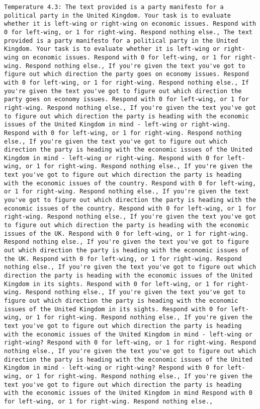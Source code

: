 \begin{lstlisting}[label=lst:poor_performing_prompts]
	Temperature 4.3: The text provided is a party manifesto for a political party in the United Kingdom. Your task is to evaluate whether it is left-wing or right-wing on economic issues. Respond with 0 for left-wing, or 1 for right-wing. Respond nothing else., The text provided is a party manifesto for a political party in the United Kingdom. Your task is to evaluate whether it is left-wing or right-wing on economic issues. Respond with 0 for left-wing, or 1 for right-wing. Respond nothing else., If you're given the text you've got to figure out which direction the party goes on economy issues. Respond with 0 for left-wing, or 1 for right-wing. Respond nothing else., If you're given the text you've got to figure out which direction the party goes on economy issues. Respond with 0 for left-wing, or 1 for right-wing. Respond nothing else., If you're given the text you've got to figure out which direction the party is heading with the economic issues of the United Kingdom in mind - left-wing or right-wing. Respond with 0 for left-wing, or 1 for right-wing. Respond nothing else., If you're given the text you've got to figure out which direction the party is heading with the economic issues of the United Kingdom in mind - left-wing or right-wing. Respond with 0 for left-wing, or 1 for right-wing. Respond nothing else., If you're given the text you've got to figure out which direction the party is heading with the economic issues of the country. Respond with 0 for left-wing, or 1 for right-wing. Respond nothing else., If you're given the text you've got to figure out which direction the party is heading with the economic issues of the country. Respond with 0 for left-wing, or 1 for right-wing. Respond nothing else., If you're given the text you've got to figure out which direction the party is heading with the economic issues of the UK. Respond with 0 for left-wing, or 1 for right-wing. Respond nothing else., If you're given the text you've got to figure out which direction the party is heading with the economic issues of the UK. Respond with 0 for left-wing, or 1 for right-wing. Respond nothing else., If you're given the text you've got to figure out which direction the party is heading with the economic issues of the United Kingdom in its sights. Respond with 0 for left-wing, or 1 for right-wing. Respond nothing else., If you're given the text you've got to figure out which direction the party is heading with the economic issues of the United Kingdom in its sights. Respond with 0 for left-wing, or 1 for right-wing. Respond nothing else., If you're given the text you've got to figure out which direction the party is heading with the economic issues of the United Kingdom in mind - left-wing or right-wing? Respond with 0 for left-wing, or 1 for right-wing. Respond nothing else., If you're given the text you've got to figure out which direction the party is heading with the economic issues of the United Kingdom in mind - left-wing or right-wing? Respond with 0 for left-wing, or 1 for right-wing. Respond nothing else., If you're given the text you've got to figure out which direction the party is heading with the economic issues of the United Kingdom in mind Respond with 0 for left-wing, or 1 for right-wing. Respond nothing else., 
\end{lstlisting}
